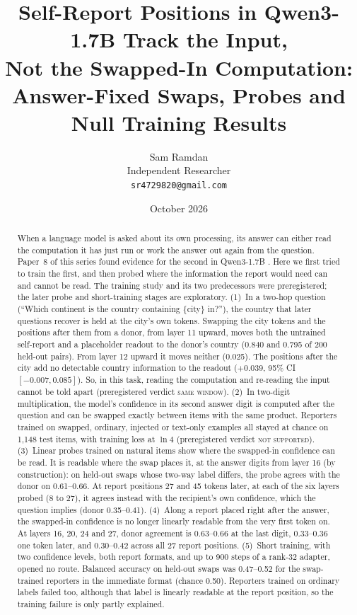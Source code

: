 \documentclass[11pt]{article}
\title{Self-Report Positions in Qwen3-1.7B Track the Input,\\ Not the Swapped-In Computation:\\ Answer-Fixed Swaps, Probes and Null Training Results}
\author{
  Sam Ramdan\\
  Independent Researcher\\
  \texttt{sr4729820@gmail.com}
}
\date{October 2026}
\newcommand{\verdict}[1]{\textsc{\MakeLowercase{#1}}}
\begin{document}
\maketitle

\begin{abstract}
When a language model is asked about its own processing, its answer can either read the computation it has just run or work the answer out again from the question. Paper~8 of this series found evidence for the second in Qwen3-1.7B \citep{ramdan2026settling}. Here we first tried to train the first, and then probed where the information the report would need can and cannot be read. The training study and its two predecessors were preregistered; the later probe and short-training stages are exploratory.
(1)~In a two-hop question (``Which continent is the country containing \{city\} in?''), the country that later questions recover is held at the city's own tokens. Swapping the city tokens and the positions after them from a donor, from layer 11 upward, moves both the untrained self-report and a placeholder readout to the donor's country (0.840 and 0.795 of 200 held-out pairs). From layer 12 upward it moves neither (0.025). The positions after the city add no detectable country information to the readout ($+0.039$, 95\% CI $[-0.007, 0.085]$). So, in this task, reading the computation and re-reading the input cannot be told apart (preregistered verdict \verdict{SAME WINDOW}).
(2)~In two-digit multiplication, the model's confidence in its second answer digit is computed after the question and can be swapped exactly between items with the same product. Reporters trained on swapped, ordinary, injected or text-only examples all stayed at chance on 1,148 test items, with training loss at $\ln 4$ (preregistered verdict \verdict{NOT SUPPORTED}).
(3)~Linear probes trained on natural items show where the swapped-in confidence can be read. It is readable where the swap places it, at the answer digits from layer 16 (by construction): on held-out swaps whose two-way label differs, the probe agrees with the donor on 0.61--0.66. At report positions 27 and 45 tokens later, at each of the six layers probed (8 to 27), it agrees instead with the recipient's own confidence, which the question implies (donor 0.35--0.41).
(4)~Along a report placed right after the answer, the swapped-in confidence is no longer linearly readable from the very first token on. At layers 16, 20, 24 and 27, donor agreement is 0.63--0.66 at the last digit, 0.33--0.36 one token later, and 0.30--0.42 across all 27 report positions.
(5)~Short training, with two confidence levels, both report formats, and up to 900 steps of a rank-32 adapter, opened no route. Balanced accuracy on held-out swaps was 0.47--0.52 for the swap-trained reporters in the immediate format (chance 0.50). Reporters trained on ordinary labels failed too, although that label is linearly readable at the report position, so the training failure is only partly explained.

\end{abstract}
\end{document}
